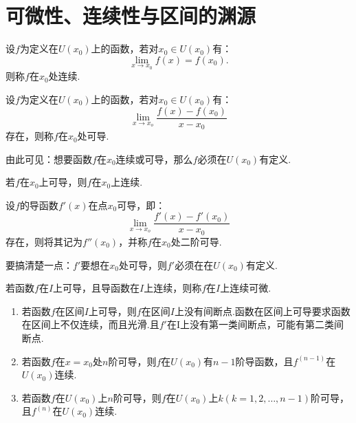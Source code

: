 \section{可微性、连续性与区间的渊源}

\begin{definition}[单点连续]
	设$f$为定义在$U(x_0)$上的函数，若对$x_0\in U(x_0)$有：
	\begin{equation}
		\displaystyle\lim_{x\to x_0}f(x)=f(x_0).
	\end{equation}
	则称$f$在$x_0$处连续.
\end{definition}

\begin{definition}[单点可微]
	设$f$为定义在$U(x_0)$上的函数，若对$x_0\in U(x_0)$有：
	\begin{equation}
		\displaystyle\lim_{x\to x_o}\dfrac{f(x)-f(x_0)}{x-x_0}
	\end{equation}
	存在，则称$f$在$x_0$处可导.
\end{definition}

由此可见：想要函数$f$在$x_0$连续或可导，那么$f$必须在$U(x_0)$有定义.

\begin{theorem}
	若$f$在$x_0$上可导，则$f$在$x_0$上连续.
\end{theorem}

\begin{definition}[单点二阶可导]
	设$f$的导函数$f'(x)$在点$x_0$可导，即：
	\begin{equation}
		\displaystyle\lim_{x\to x_o}\dfrac{f'(x)-f'(x_0)}{x-x_0}
	\end{equation}
	存在，则将其记为$f''(x_0)$，并称$f$在$x_0$处二阶可导.
\end{definition}

要搞清楚一点：$f'$要想在$x_0$处可导，则$f'$必须在在$U(x_0)$有定义.

\begin{definition}[补充：连续可微]
	若函数$f$在$I$上可导，且导函数在$I$上连续，则称$f$在$I$上连续可微.
\end{definition}

\begin{proposition}
	\begin{enumerate}
		\item 若函数$f$在区间$I$上可导，则$f$在区间$I$上没有间断点.函数在区间上可导要求函数在区间上不仅连续，而且光滑.且$f'$在I上没有第一类间断点，可能有第二类间断点.
		\item 若函数$f$在$x=x_0$处$n$阶可导，则$f$在$U(x_0)$有$n-1$阶导函数，且$f^{(n-1)}$在$U(x_0)$连续.
		\item 若函数$f$在$U(x_0)$上$n$阶可导，则$f$在$U(x_0)$上$k(k=1,2,\dots,n-1)$阶可导，且$f^{(n)}$在$U(x_0)$连续.
	\end{enumerate}
\end{proposition}